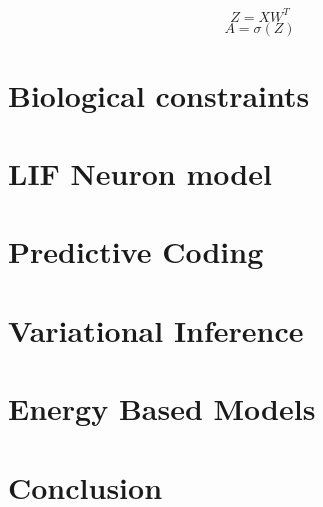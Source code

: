 \documentclass[a4paper,twoside,11pt]{report} %
\begin{document}
\begin{equation}
Z = XW^T
\end{equation}
\begin{equation}
A = \sigma(Z)
\end{equation}
\section{Biological constraints}
\section{LIF Neuron model}

\section{Predictive Coding}
\section{Variational Inference}

\section{Energy Based Models}

\section{Conclusion}

\newpage


\end{document}
